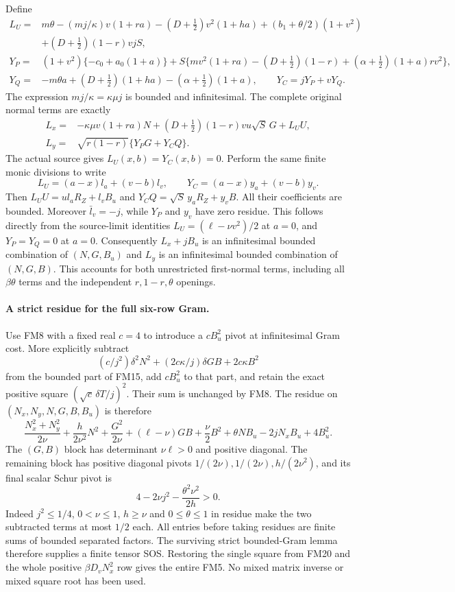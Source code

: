Define
\[
\begin{split}
 L_U={}&m\theta-(mj/\kappa)v(1+ra)
 -(D+\tfrac12)v^2(1+ha)+(b_1+\theta/2)(1+v^2)\\
       &+(D+\tfrac12)(1-r)vjS,\\
 Y_P={}&(1+v^2)\{-c_0+a_0(1+a)\}
       +S\{mv^2(1+ra)-(D+\tfrac12)(1-r)
                        +(\alpha+\tfrac12)(1+a)rv^2\},\\
 Y_Q={}&-m\theta a+(D+\tfrac12)(1+ha)
                                  -(\alpha+\tfrac12)(1+a),\qquad
 Y_C=jY_P+vY_Q.
\end{split}\tag{FM17}
\]
The expression $mj/\kappa=\kappa\mu j$ is bounded and
infinitesimal. The complete original normal terms are exactly
\[
\begin{split}
 L_x={}&-\kappa\mu v(1+ra)N
       +(D+\tfrac12)(1-r)vu\sqrt S\,G+L_UU,\\
 L_y={}&\sqrt{r(1-r)}\{Y_PG+Y_CQ\}.
\end{split}\tag{FM18}
\]
The actual source gives $L_U(x,b)=Y_C(x,b)=0$. Perform the same
finite monic divisions to write
\[
 L_U=(a-x)l_a+(v-b)l_v,\qquad
 Y_C=(a-x)y_a+(v-b)y_v.
 \tag{FM19}
\]
Then $L_UU=u l_aR_Z+l_vB_u$ and
$Y_CQ=\sqrt S\,y_aR_Z+y_vB$. All their coefficients are
bounded. Moreover $\bar l_v=-j$, while $Y_P$ and $y_v$ have
zero residue. This follows directly from the source-limit
identities
$L_U=(\ell-\nu v^2)/2$ at $a=0$, and
$Y_P=Y_Q=0$ at $a=0$.
Consequently $L_x+jB_u$ is an infinitesimal bounded combination
of $(N,G,B_u)$ and $L_y$ is an infinitesimal bounded combination
of $(N,G,B)$. This accounts for both unrestricted first-normal
terms, including all $\beta\theta$ terms and the independent
$r,1-r,\theta$ openings.

\paragraph{A strict residue for the full six-row Gram.}
Use FM8 with a fixed real $c=4$ to introduce a $cB_u^2$ pivot
at infinitesimal Gram cost. More explicitly subtract
\[
 (c/j^2)\delta^2N^2+(2c\kappa/j)\delta GB+2c\kappa B^2
 \tag{FM20}
\]
from the bounded part of FM15, add $cB_u^2$ to that part, and
retain the exact positive square $(\sqrt c\,\delta T/j)^2$.
Their sum is unchanged by FM8. The residue on
$(N_x,N_y,N,G,B,B_u)$ is therefore
\[
 \frac{N_x^2+N_y^2}{2\nu}+\frac h{2\nu^2}N^2
 +\frac{G^2}{2\nu}+(\ell-\nu)GB+\frac\nu2B^2
       +\theta NB_u-2jN_xB_u+4B_u^2.
 \tag{FM21}
\]
The $(G,B)$ block has determinant $\nu\ell>0$ and positive
diagonal. The remaining block has positive diagonal pivots
$1/(2\nu),1/(2\nu),h/(2\nu^2)$, and its final scalar Schur
pivot is
\[
 4-2\nu j^2-\frac{\theta^2\nu^2}{2h}>0.
 \tag{FM22}
\]
Indeed $j^2\le1/4$, $0<\nu\le1$, $h\ge\nu$ and
$0\le\theta\le1$ in residue make the two subtracted terms
at most $1/2$ each. All entries before taking residues are finite
sums of bounded separated factors. The surviving strict
bounded-Gram lemma therefore supplies a finite tensor SOS.
Restoring the single square from FM20 and the whole positive
$\beta D_vN_x^2$ row gives the entire FM5. No mixed matrix inverse
or mixed square root has been used.

